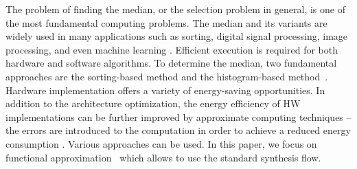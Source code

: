 The problem of finding the median, or the selection problem in general, is one of the most fundamental computing problems. The median and its variants are widely used in many applications such as sorting, digital signal processing, image processing, and even machine learning \cite{Ferdowsi:2014,Nikolova:2004:Med,Zhang_arxiv.2205.15867}. 
Efficient execution is required for both hardware and software algorithms. To determine the median, two fundamental approaches are the sorting-based method and the histogram-based method~\cite{Adams}.
Hardware implementation offers a variety of energy-saving opportunities. %
In addition to the architecture optimization, the energy efficiency of HW implementations can be further improved by approximate computing techniques -- the errors are introduced to the computation in order to achieve a reduced energy consumption \cite{Mittal:2016}. Various approaches can be used. In this paper, we focus on functional approximation~\cite{bookaxc} which allows to use the standard synthesis flow.

